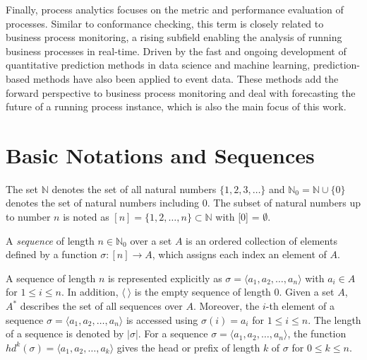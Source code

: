 Finally, process analytics focuses on the metric and performance evaluation of processes. Similar to conformance checking, this term is closely related to business process monitoring, a rising subfield enabling the analysis of running business processes in real-time.
Driven by the fast and ongoing development of quantitative prediction methods in data science and machine learning, prediction-based methods have also been applied to event data.
These methods add the forward perspective to business process monitoring and deal with forecasting the future of a running process instance, which is also the main focus of this work.


\section{Basic Notations and Sequences}

The set $\mathbb{N}$ denotes the set of all natural numbers $\{1, 2, 3, \dots\}$ and $\mathbb{N}_0 = \mathbb{N} \cup \{0\}$ denotes the set of natural numbers including 0.
The subset of natural numbers up to number $n$ is noted as $[n] = \{1, 2, \dots, n\} \subset \mathbb{N}$ with [0] = $\emptyset$.
\begin{definition}[Sequence]
		A \textit{sequence} of length $n \in \mathbb{N}_0$ over a set $A$ is an ordered collection of elements defined by a function $\sigma \colon [n]\to A$, which assigns each index an element of $A$.
\end{definition}
A sequence  of length $n$ is represented explicitly as $\sigma = \langle a_1, a_2, \dots, a_n\rangle $ with $a_i \in A$ for $1 \leq i \leq n$. In addition, $\langle~\rangle$ is the empty sequence of length $0$.
Given a set $A$, $A^*$ describes the set of all sequences over $A$.
Moreover, the $i$-th element of a sequence $\sigma = \langle a_1, a_2, \dots, a_n\rangle$ is accessed using $\sigma(i)= a_i$ for $1 \leq i \leq n$.
The length of a sequence is denoted by $|\sigma|$.
For a sequence $\sigma=\langle a_1, a_2, \dots, a_n\rangle$, the function
$hd^k(\sigma)= \langle a_1, a_2, \dots, a_k\rangle$ gives the head or prefix of length $k$ of $\sigma$ for $0 \leq k \leq n$.

